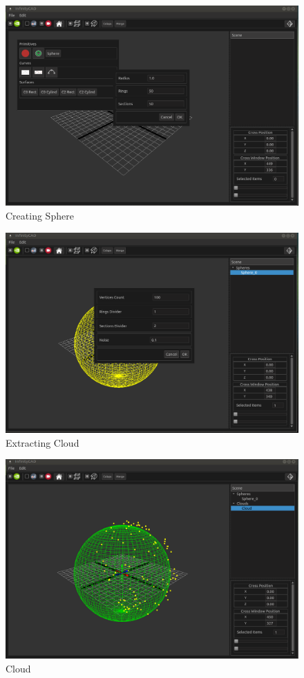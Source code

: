 \documentclass{book}
\begin{document}
\begin{figure}[H]
    \includegraphics[width=1\textwidth]{./graphics/gui/gui3.png}
    \caption{Creating Sphere}
    \label{fig:gui3}
\end{figure}

\begin{figure}[H]
    \includegraphics[width=1\textwidth]{./graphics/gui/gui6.png}
    \caption{Extracting Cloud}
    \label{fig:gui6}
\end{figure}

\begin{figure}[H]
    \includegraphics[width=1\textwidth]{./graphics/gui/gui7.png}
    \caption{Cloud}
    \label{fig:gui7}
\end{figure}



\begin{thebibliography}{1}
    
    
\end{thebibliography}
\end{document}
